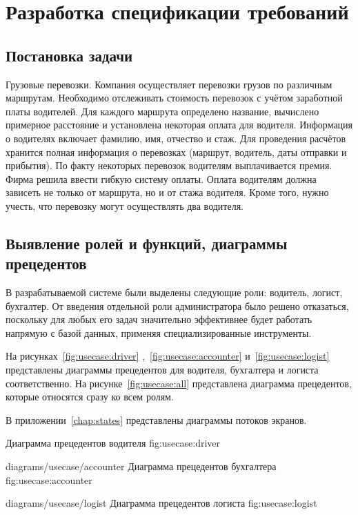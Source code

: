 \chapter{Разработка спецификации требований}
\label{chap:spec}

\section{Постановка задачи}
Грузовые перевозки. Компания осуществляет перевозки грузов 
по различным маршрутам. Необходимо отслеживать стоимость перевозок 
с учётом заработной платы водителей. Для каждого маршрута определено 
название, вычислено примерное расстояние и установлена некоторая оплата 
для водителя. Информация о водителях включает фамилию, имя, отчество и стаж. 
Для проведения расчётов хранится полная информация о перевозках 
(маршрут, водитель, даты отправки и прибытия). По факту некоторых 
перевозок водителям выплачивается премия. Фирма решила ввести гибкую 
систему оплаты. Оплата водителям должна зависеть не только от маршрута, 
но и от стажа водителя. Кроме того, нужно учесть, что перевозку 
могут осуществлять два водителя.

\section{Выявление ролей и функций, диаграммы прецедентов}
В разрабатываемой системе были выделены следующие роли: 
водитель, логист, бухгалтер. 
От введения отдельной роли администратора было решено отказаться, 
поскольку для любых его задач значительно эффективнее будет работать
напрямую с базой данных, применяя специализированные инструменты.

На рисунках~\ref{fig:usecase:driver}
,~\ref{fig:usecase:accounter} 
и~\ref{fig:usecase:logist}~
представлены диаграммы прецедентов для 
водителя, бухгалтера и логиста соответственно. 
На рисунке~\ref{fig:usecase:all} 
представлена диаграмма прецедентов, которые относятся сразу ко всем ролям.

В приложении~\ref{chap:states} представлены диаграммы потоков экранов.

    {Диаграмма прецедентов водителя}
    {fig:usecase:driver}

\image
    {diagrams/usecase/accounter}
    {Диаграмма прецедентов бухгалтера}
    {fig:usecase:accounter}

\image
    {diagrams/usecase/logist}
    {Диаграмма прецедентов логиста}
    {fig:usecase:logist}

